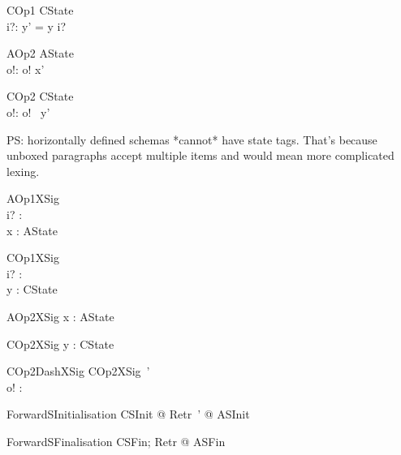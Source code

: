 \begin{schema}{COp1}
   \Delta CState \\
   i?: \nat
\where
   y' = y \cat \langle i? \rangle
\end{schema}

\begin{schema}{AOp2}
   \Xi AState \\
   o!: \nat
\where
    o! \in  x'
\end{schema}

\begin{schema}{COp2}
   \Xi CState \\
   o!: \nat
\where
   o! \in \ran~y'
\end{schema}

PS: horizontally defined schemas *cannot* have state tags. That's because
unboxed paragraphs accept multiple items and would mean more complicated lexing.

\begin{schema}{AOp1XSig}\\
 i? : \nat \\
 x : \power \nat
\where
 AState
\end{schema}

\begin{schema}{COp1XSig}\\
 i? : \nat \\
 y : \seq \nat
\where
 CState
\end{schema}

\begin{schema}{AOp2XSig}
 x : \power \nat
\where
 AState
\end{schema}

\begin{schema}{COp2XSig}
 y : \seq \nat
\where
 CState
\end{schema}

\begin{schema}{COp2DashXSig}
   COp2XSig~' \\
   o! : \nat
\end{schema}

\begin{theorem}{ForwardSInitialisation}
   \forall CSInit @ \exists Retr~' @ ASInit
\end{theorem}

\begin{theorem}{ForwardSFinalisation}
   \forall CSFin; Retr @ ASFin
\end{theorem}

